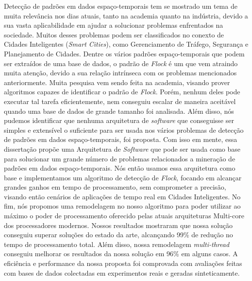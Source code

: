 Detecção de padrões em dados espaço-temporais tem se mostrado um tema de muita relevância nos dias atuais, tanto na
academia quanto na indústria, devido a sua vasta aplicabilidade em ajudar a solucionar problemas enfrentados na
sociedade. Muitos desses problemas podem ser classificados no conexto de Cidades Inteligentes (\textit{Smart Cities}),
como Gerenciamento de Tráfego, Segurança e Planejamento de Cidades. Dentre os vários padrões espaço-temporais que podem
ser extraídos de uma base de dados, o padrão de \textit{Flock} é um que vem atraindo muita atenção, devido a sua relação
intrínseca com os problemas mencionados anteriormente. Muita pesquisa vem sendo feita na academia, visando prover
algoritmos capazes de identificar o padrão de \textit{Flock}. Porém, nenhum deles pode executar tal tarefa
eficientemente, nem conseguiu escalar de maneira aceitável quando uma base de dados de grande tamanho foi analisada.
Além disso, nós pudemos identificar que nenhuma arquitetura de \textit{software} que conseguisse ser simples e
extensível o suficiente para ser usada nos vários problemas de detecção de padrões em dados espaço-temporais, foi
proposta. Com isso em mente, essa dissertação propõe uma Arquitetura de \textit{Software} que pode ser usada como base
para solucionar um grande número de problemas relacionados a mineração de padrões em dados espaço-temporais. Nós então
usamos essa arquitetura como base e implementamos um algoritmo de detecção de \textit{Flock}, focando em alcançar
grandes ganhos em tempo de processamento, sem comprometer a precisão, visando então cenários de aplicações de tempo real
em Cidades Inteligentes. No fim, nós propomos uma remodelagem no nosso algoritmo para poder utilizar ao máximo o poder
de processamento oferecido pelas atuais arquiteturas Multi-core dos processadores modernos. Nossos resultados mostraram
que nossa solução conseguiu superar soluções do estado da arte, alcançando 99\% de redução no tempo de processamento
total. Além disso, nossa remodelagem \textit{multi-thread} conseguiu melhorar os resultados da nossa solução em 96\% em
alguns casos. A eficiência e performance da nossa proposta foi comprovada com avaliações feitas com bases de dados
colectadas em experimentos reais e geradas sinteticamente.
